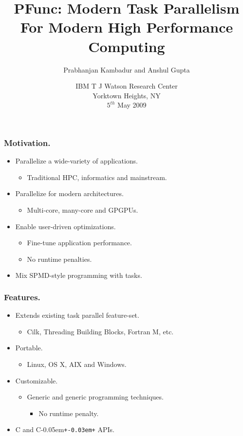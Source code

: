 \documentclass{beamer}
\title{PFunc: Modern Task Parallelism For Modern High Performance Computing}
\author{Prabhanjan Kambadur and Anshul Gupta}
\date{{\small IBM T J Watson Research Center}\\
{\footnotesize Yorktown Heights, NY}\\
$5^{th}$ May 2009}
\newcommand{\Cpp}{C\kern-0.05em\texttt{+\kern-0.03em+}}
\begin{document}
\begin{frame}
  \titlepage
\end{frame}

\begin{frame}
\frametitle{Motivation.}
\begin{itemize}
\item Parallelize a wide-variety of applications.
  \begin{itemize}
  \item Traditional HPC, informatics and mainstream.
  \end{itemize}
\item Parallelize for modern architectures.
  \begin{itemize}
  \item Multi-core, many-core and GPGPUs.
  \end{itemize}
\item Enable user-driven optimizations.
  \begin{itemize}
  \item Fine-tune application performance.
  \item No runtime penalties.
  \end{itemize}
\item Mix SPMD-style programming with tasks.
\end{itemize}
\end{frame}

\begin{frame}
\frametitle{Features.}
\begin{itemize}
\item Extends existing task parallel feature-set. 
  \begin{itemize}
  \item Cilk, Threading Building Blocks, Fortran M, etc.
  \end{itemize}
\item Portable.
  \begin{itemize}
  \item Linux, OS X, AIX and Windows.
  \end{itemize}
\item Customizable.
  \begin{itemize}
  \item Generic and generic programming techniques.
    \begin{itemize}
    \item No runtime penalty.
    \end{itemize}
  \end{itemize}
\item C and \Cpp{} APIs.
\end{itemize}
\end{frame}
\end{document}

